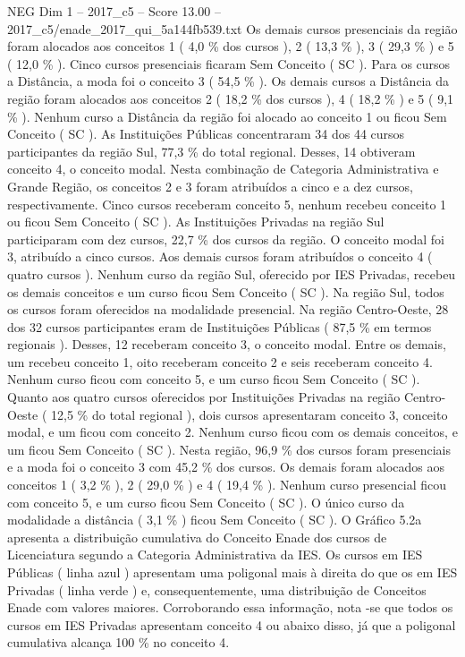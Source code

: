 \begin{textsample}{NEG Dim 1 – 2017\_c5 – Score 13.00 – 2017\_c5/enade\_2017\_qui\_5a144fb539.txt}
Os demais cursos presenciais da região foram alocados aos conceitos 1 ( 4,0 \% dos cursos ), 2 ( 13,3 \% ), 3 ( 29,3 \% ) e 5 ( 12,0 \% ).
Cinco cursos presenciais ficaram Sem Conceito ( SC ).
Para os cursos a Distância, a moda foi o conceito 3 ( 54,5 \% ).
Os demais cursos a Distância da região foram alocados aos conceitos 2 ( 18,2 \% dos cursos ), 4 ( 18,2 \% ) e 5 ( 9,1 \% ).
Nenhum curso a Distância da região foi alocado ao conceito 1 ou ficou Sem Conceito ( SC ).
As Instituições Públicas concentraram 34 dos 44 cursos participantes da região Sul, 77,3 \% do total regional.
Desses, 14 obtiveram conceito 4, o conceito modal.
Nesta combinação de Categoria Administrativa e Grande Região, os conceitos 2 e 3 foram atribuídos a cinco e a dez cursos, respectivamente.
Cinco cursos receberam conceito 5, nenhum recebeu conceito 1 ou ficou Sem Conceito ( SC ).
As Instituições Privadas na região Sul participaram com dez cursos, 22,7 \% dos cursos da região.
O conceito modal foi 3, atribuído a cinco cursos.
Aos demais cursos foram atribuídos o conceito 4 ( quatro cursos ).
Nenhum curso da região Sul, oferecido por IES Privadas, recebeu os demais conceitos e um curso ficou Sem Conceito ( SC ).
Na região Sul, todos os cursos foram oferecidos na modalidade presencial.
Na região Centro-Oeste, 28 dos 32 cursos participantes eram de Instituições Públicas ( 87,5 \% em termos regionais ).
Desses, 12 receberam conceito 3, o conceito modal.
Entre os demais, um recebeu conceito 1, oito receberam conceito 2 e seis receberam conceito 4.
Nenhum curso ficou com conceito 5, e um curso ficou Sem Conceito ( SC ).
Quanto aos quatro cursos oferecidos por Instituições Privadas na região Centro-Oeste ( 12,5 \% do total regional ), dois cursos apresentaram conceito 3, conceito modal, e um ficou com conceito 2.
Nenhum curso ficou com os demais conceitos, e um ficou Sem Conceito ( SC ).
Nesta região, 96,9 \% dos cursos foram presenciais e a moda foi o conceito 3 com 45,2 \% dos cursos.
Os demais foram alocados aos conceitos 1 ( 3,2 \% ), 2 ( 29,0 \% ) e 4 ( 19,4 \% ).
Nenhum curso presencial ficou com conceito 5, e um curso ficou Sem Conceito ( SC ).
O único curso da modalidade a distância ( 3,1 \% ) ficou Sem Conceito ( SC ).
O Gráfico 5.2a apresenta a distribuição cumulativa do Conceito Enade dos cursos de Licenciatura segundo a Categoria Administrativa da IES.
Os cursos em IES Públicas ( linha azul ) apresentam uma poligonal mais à direita do que os em IES Privadas ( linha verde ) e, consequentemente, uma distribuição de Conceitos Enade com valores maiores.
Corroborando essa informação, nota -se que todos os cursos em IES Privadas apresentam conceito 4 ou abaixo disso, já que a poligonal cumulativa alcança 100 \% no conceito 4.

\end{textsample}
